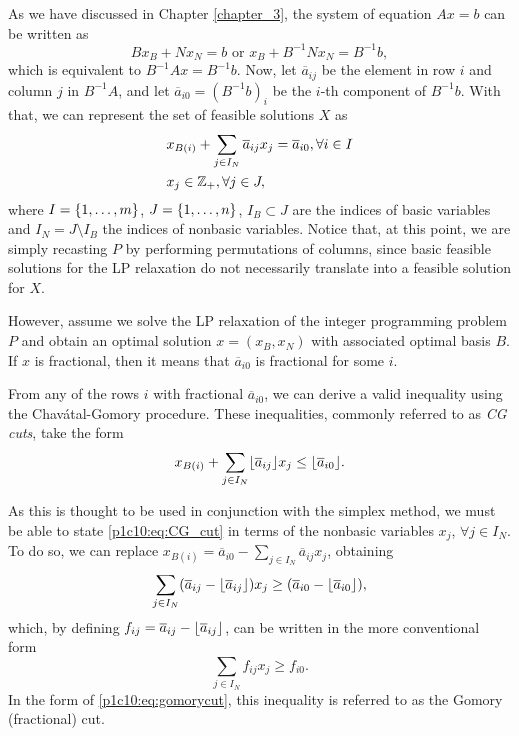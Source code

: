 As we have discussed in Chapter \ref{chapter_3}, the system of equation $Ax= b$ can be written as
%
\begin{equation*}
	Bx_B + Nx_N = b \text{ or } x_B + B^{-1}Nx_N = B^{-1}b,
\end{equation*}
%
which is equivalent to $B^{-1}Ax = B^{-1}b$. Now, let $\overline{a}_{ij}$ be the element in row $i$ and column $j$ in $B^{-1}A$, and let $\overline{a}_{i0} = (B^{-1}b)_i$ be the $i$-th component of $B^{-1}b$. With that, we can represent the set of feasible solutions $X$ as
%
\begin{align*}
	&x_{B(i)} + \sum_{j \in I_N} \overline{a}_{ij}x_j = \overline{a}_{i0},  \forall i \in I\\
	&x_j \in \mathbb{Z}_+, \forall j \in J,
\end{align*}
%
where $I = \left\{ 1, \dots, m \right \}$, $J = \left\{ 1, \dots, n \right \}$, $I_B \subset J$ are the indices of basic variables and $I_N = J \setminus I_B$ the indices of nonbasic variables. Notice that, at this point, we are simply recasting $P$ by performing permutations of columns, since basic feasible solutions for the LP relaxation do not necessarily translate into a feasible solution for $X$.

However, assume we solve the LP relaxation of the integer programming problem $P$ and obtain an optimal solution $x = (x_B, x_N)$ with associated optimal basis $B$. If $x$ is fractional, then it means that $\overline{a}_{i0}$ is fractional for some $i$.

From any of the rows $i$ with fractional $\overline{a}_{i0}$, we can derive a valid inequality using the Chav\'atal-Gomory procedure. These inequalities, commonly referred to as \emph{CG cuts}, take the form
%
\begin{equation}
	x_{B(i)} + \sum_{j \in I_N} \lfloor \overline{a}_{ij} \rfloor x_j \leq \lfloor \overline{a}_{i0} \rfloor. \label{p1c10:eq:CG_cut}	
\end{equation}

As this is thought to be used in conjunction with the simplex method, we must be able to state \eqref{p1c10:eq:CG_cut} in terms of the nonbasic variables $x_j$, $\forall j \in I_N$. To do so, we can replace $x_{B(i)} = \overline{a}_{i0} - \sum_{j \in I_N} \overline{a}_{ij}x_j$, obtaining 
%
\begin{equation*}
	\sum_{j \in I_N} (\overline{a}_{ij} - \lfloor \overline{a}_{ij} \rfloor)x_j \geq (\overline{a}_{i0} - \lfloor \overline{a}_{i0} \rfloor),
\end{equation*}
%
which, by defining $f_{ij} = \overline{a}_{ij} - \lfloor \overline{a}_{ij} \rfloor$, can be written in the more conventional form
%
\begin{equation}
	\sum_{j \in I_N} f_{ij}x_j \geq f_{i0}. \label{p1c10:eq:gomorycut}
\end{equation}
%
In the form of \eqref{p1c10:eq:gomorycut}, this inequality is referred to as the Gomory (fractional) cut. 

